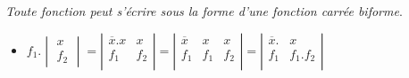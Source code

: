 \emph{Toute fonction peut s'écrire sous la forme d'une fonction carrée biforme}. 



\begin{itemize}
\item $f_1 . \begin{vmatrix}
                   x \\  f_2 
                 \end{vmatrix} 
                   =  \left| \begin{array}{c|c} 
                                  \overline{x} . x & x \\
                                  f_1 & f_2  \\
                             \end{array} \right|
                             = \left| \begin{array}{c|c|c}  
                                     \overline{x} &   x & x \\
                                       f_1 & f_1 & f_2  \\
                                      \end{array} \right| 
                                      = \left| \begin{array}{c|c} 
                                          \overline{x} . & x \\
                                          f_1 & f_1 . f_2  \\
                                     \end{array} \right| $ 



\end{itemize}
